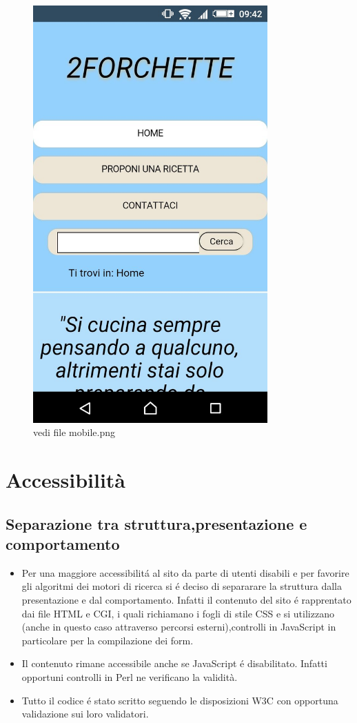\documentclass[12pt]{article}
\begin{document}
\begin{itemize}
			\begin{figure}[ht!]
			\centering
			\includegraphics[width=90mm]{mobile}
			\caption{vedi file mobile.png}
			\end{figure}
		
				\end{itemize}
	

	\newpage
		\section{Accessibilit\`a}
		\subsection{Separazione tra struttura,presentazione e comportamento}
		\begin{itemize}
			\item Per una maggiore accessibilit\'a al sito da parte di utenti disabili e per favorire gli algoritmi dei motori di ricerca si \'e deciso di separarare la struttura dalla presentazione e dal comportamento.
			Infatti il contenuto del sito \'e rapprentato dai file HTML e CGI, i quali richiamano i fogli di stile CSS e si utilizzano (anche in questo caso attraverso percorsi esterni),controlli in JavaScript in particolare per la compilazione dei form. 

			\item Il contenuto rimane accessibile anche se JavaScript \'e disabilitato. Infatti opportuni controlli in Perl ne verificano la validit\`a.

			\item Tutto il codice \'e stato scritto seguendo le disposizioni W3C con opportuna validazione sui loro validatori.
		\end{itemize}
\end{document}
